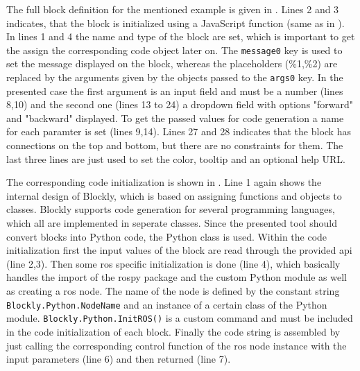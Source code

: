 The full block definition for the mentioned example is given in . Lines 2 and 3 indicates, that the block is initialized using a JavaScript function (same as in ). In lines 1 and 4 the name and type of the block are set, which is important to get the assign the corresponding code object later on. The \lstinline!message0! key is used to set the message displayed on the block, whereas the placeholders (\%1,\%2) are replaced by the arguments given by the objects passed to the \lstinline!args0! key. In the presented case the first argument is an input field and must be a number (lines 8,10) and the second one (lines 13 to 24) a dropdown field with options "forward" and "backward" displayed. To get the passed values for code generation a name for each paramter is set (lines 9,14). Lines 27 and 28 indicates that the block has connections on the top and bottom, but there are no constraints for them. The last three lines are just used to set the color, tooltip and an optional help URL. \\


\begin{figure}[htbp]
	
\end{figure}

The corresponding code initialization is shown in . Line 1 again shows the internal design of Blockly, which is based on assigning functions and objects to classes. Blockly supports code generation for several programming languages, which all are implemented in seperate classes. Since the presented tool should convert blocks into Python code, the Python class is used. Within the code initialization first the input values of the block are read through the provided \gls{api} (line 2,3). Then some \gls{ros} specific initialization is done (line 4), which basically handles the import of the rospy package and the custom Python module as well as creating a \gls{ros} node. The name of the node is defined by the constant string \lstinline!Blockly.Python.NodeName! and an instance of a certain class of the Python module. \lstinline!Blockly.Python.InitROS()! is a custom command and must be included in the code initialization of each block. Finally the code string is assembled by just calling the corresponding control function of the \gls{ros} node instance with the input parameters (line 6) and then returned (line 7).

